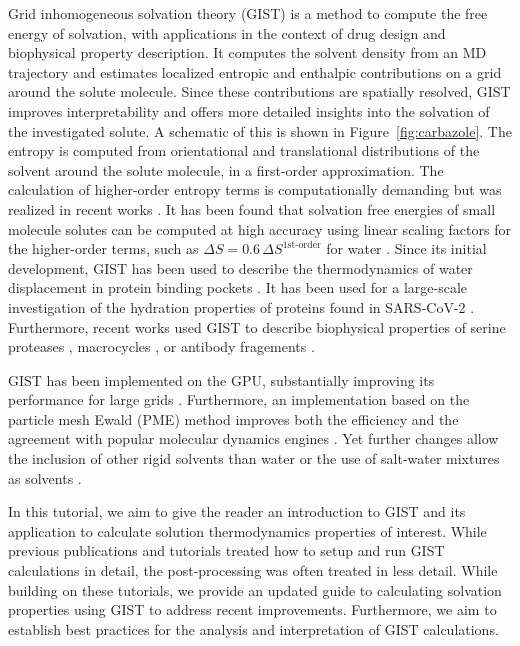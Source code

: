 \documentclass[9pt,tutorial]{livecoms}
\begin{document}
Grid inhomogeneous solvation theory (GIST) \cite{Nguyen2012} is a method to compute the free energy of solvation, with applications in the context of drug design and biophysical property description.
It computes the solvent density from an MD trajectory and estimates localized entropic and enthalpic contributions on a grid around the solute molecule.
Since these contributions are spatially resolved, GIST improves interpretability and offers more detailed insights into the solvation of the investigated solute.
A schematic of this is shown in Figure~\ref{fig:carbazole}.  
The entropy is computed from orientational and translational distributions of the solvent around the solute molecule, in a first-order approximation. 
The calculation of higher-order entropy terms is computationally demanding but was realized in recent works \cite{Nguyen2016-gist-second-order, Waibl2021-gist-salt}.
It has been found that solvation free energies of small molecule solutes can be computed at high accuracy using linear scaling factors for the higher-order terms, such as $\Delta S = 0.6\, \Delta S^\text{1st-order}$ for water \cite{Chen2021,Waibl2022-gist-solvents}.
Since its initial development, GIST has been used to describe the thermodynamics of water displacement in protein binding pockets \cite{Nguyen2016-gist-second-order,Ramsey2016,Balius2017-gist-ligand-discovery,Hufner-Wulsdorf2020-gist-drug-design}.
It has been used for a large-scale investigation of the hydration properties of proteins found in SARS-CoV-2 \cite{Olson2020-covid-gist}.
Furthermore, recent works used GIST to describe biophysical properties of serine proteases \cite{Kraml2019-gigist}, macrocycles \cite{Kamenik2020-gist-macrocycles}, or antibody fragements \cite{Waibl2021-gist-antibodies}.

GIST has been implemented on the GPU, substantially improving its performance for large grids \cite{Kraml2019-gigist}.
Furthermore, an implementation based on the particle mesh Ewald (PME) \cite{Darden1993-pme} method improves both the efficiency and the agreement with popular molecular dynamics engines \cite{Chen2021}. 
Yet further changes allow the inclusion of other rigid solvents than water \cite{Kraml2020,Waibl2022-gist-solvents} or the use of salt-water mixtures as solvents \cite{Waibl2021-gist-salt}.

In this tutorial, we aim to give the reader an introduction to GIST and its application to calculate solution thermodynamics properties of interest. 
While previous publications \cite{Ramsey2016} and tutorials \cite{amber_tut_gist} treated how to setup and run GIST calculations in detail, the post-processing was often treated in less detail. 
While building on these tutorials, we provide an updated guide to calculating solvation properties using GIST to address recent improvements.
Furthermore, we aim to establish best practices for the analysis and interpretation of GIST calculations.
\end{document}
